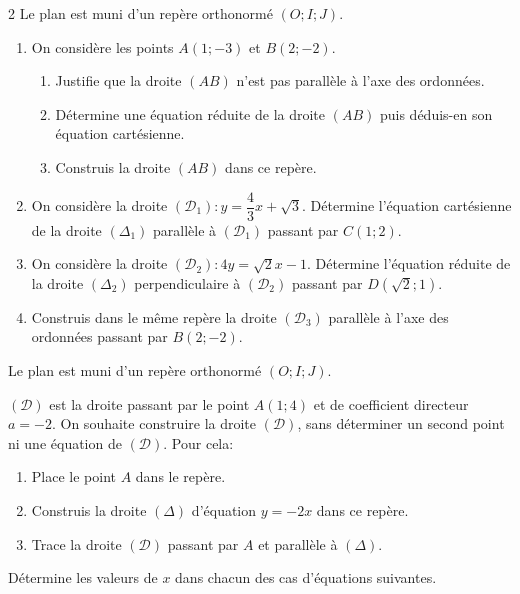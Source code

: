 \begin{multicols*}{2}
  	Le plan est muni d'un repère orthonormé $\left(O; I;J\right)$. 
  	\begin{enumerate}
  		\item On considère les points $A(1;-3)$ et  $B(2;-2)$. 
  		\begin{enumerate} 
  			\item Justifie que la droite $(AB)$ n'est pas parallèle à l'axe des ordonnées.
  			\item Détermine une équation réduite de la droite $(AB)$ puis déduis-en son équation cartésienne.
  			\item  Construis la droite $(AB)$ dans ce repère.
  		\end{enumerate}
  		\item   On considère la droite $(\mathcal{D}_{1}): y=\dfrac{4}{3}x+\sqrt{3}$. Détermine l'équation cartésienne de la droite $({\Delta}_{1})$ parallèle à  $(\mathcal{D}_{1})$ passant par $C(1;2)$.
  		\item On considère la droite $(\mathcal{D}_{2}): 4y=\sqrt{2}x-1$. Détermine l'équation réduite de la droite $({\Delta}_{2})$ perpendiculaire à  $(\mathcal{D}_{2})$ passant par $D(\sqrt{2};1)$.
  		\item Construis dans le même repère la droite $(\mathcal{D}_{3})$ parallèle à l'axe des ordonnées passant par $B(2;-2)$.
  	\end{enumerate}
  	
  	\dures
  	 
  	\begin{center}
  	\end{center}
  	\begin{center}
  	\end{center}
  	Le plan est muni d'un  repère orthonormé $\left(O; I;J\right)$.
  	
  	$(\mathcal{D})$ est la droite passant par le point  $A(1;4)$ et de coefficient directeur $a=-2$. On souhaite construire la droite $(\mathcal{D})$, sans déterminer un second point ni une équation de $(\mathcal{D})$. Pour cela:
  	\begin{enumerate}
  		\item Place le point $A$ dans le repère.
  		\item Construis la droite $(\mathcal{\Delta})$ d'équation $y=-2x$ dans ce repère.
  		\item Trace la droite  $(\mathcal{D})$ passant par $A$ et parallèle à $(\mathcal{\Delta})$.
  	\end{enumerate}
  	\begin{center}
  	\end{center}
  	Détermine les valeurs de $x$ dans chacun des cas d'équations suivantes.
  	

\end{multicols*}
